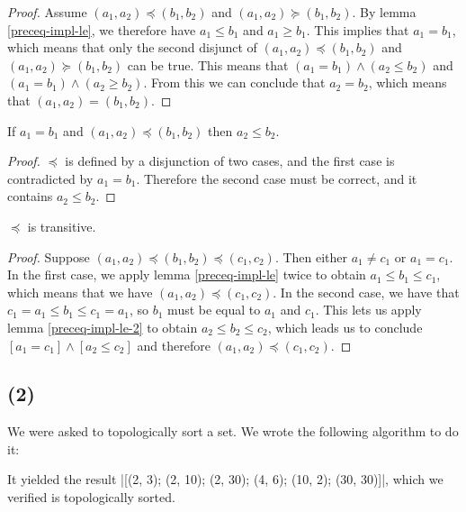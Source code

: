 \documentclass[a4paper]{article}
\begin{document}
\begin{proof} Assume \((a_1, a_2) \preceq (b_1, b_2)\) and \((a_1, a_2) \succeq (b_1, b_2)\). By lemma \ref{preceq-impl-le}, we therefore have \(a_1 \le b_1\) and \(a_1 \ge b_1\). This implies that \(a_1 = b_1\), which means that only the second disjunct of \((a_1, a_2) \preceq (b_1, b_2)\) and \((a_1, a_2) \succeq (b_1, b_2)\) can be true. This means that \((a_1 = b_1) \land (a_2 \le b_2)\) and \((a_1 = b_1) \land (a_2 \ge b_2)\). From this we can conclude that \(a_2 = b_2\), which means that \((a_1, a_2) = (b_1, b_2)\).\end{proof}

\begin{lemma} \label{preceq-impl-le-2} If \(a_1 = b_1\) and \((a_1, a_2) \preceq (b_1, b_2)\) then \(a_2 \le b_2\).\end{lemma}

\begin{proof} \(\preceq\) is defined by a disjunction of two cases, and the first case is contradicted by \(a_1 = b_1\). Therefore the second case must be correct, and it contains \(a_2 \le b_2\).\end{proof}

\begin{theorem} \(\preceq\) is transitive. \end{theorem}

\begin{proof} Suppose \((a_1, a_2) \preceq (b_1, b_2) \preceq (c_1, c_2)\). Then either \(a_1 \ne c_1\) or \(a_1 = c_1\). In the first case, we apply lemma \ref{preceq-impl-le} twice to obtain \(a_1 \le b_1 \le c_1\), which means that we have \((a_1, a_2) \preceq (c_1, c_2)\). In the second case, we have that \(c_1 = a_1 \le b_1 \le c_1 = a_1\), so \(b_1\) must be equal to \(a_1\) and \(c_1\). This lets us apply lemma \ref{preceq-impl-le-2} to obtain \(a_2 \le b_2 \le c_2\), which leads us to conclude \([a_1 = c_1] \land [a_2 \le c_2]\) and therefore \((a_1, a_2) \preceq (c_1, c_2)\).\end{proof}

\subsection*{(2)}

We were asked to topologically sort a set. We wrote the following algorithm to do it:


It yielded the result \code|[(2, 3); (2, 10); (2, 30); (4, 6); (10, 2); (30, 30)]|, which we verified is topologically sorted.
\end{document}
